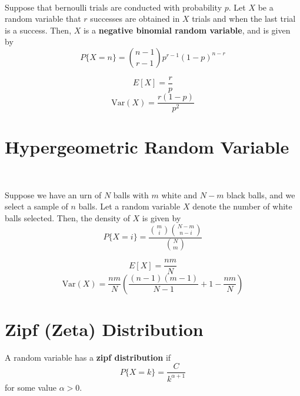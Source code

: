 \documentclass{article}
\begin{document}
\ 

\begin{definition}

Suppose that bernoulli trials are conducted with probability $p$. Let $X$ be a random variable that $r$ successes are obtained in $X$ trials and when the last trial is a success. Then, $X$ is a \textbf{negative binomial random variable}, and is given by $$P\{X = n\} = \binom{n-1}{r-1}p^{r-1}(1-p)^{n-r}$$

\end{definition}

\begin{proposition}

$$E[X] = \frac{r}{p}$$
$$\text{Var}(X) = \frac{r(1-p)}{p^2}$$

\end{proposition}

\section{Hypergeometric Random Variable}

\ 

\begin{definition}

Suppose we have an urn of $N$ balls with $m$ white and $N-m$ black balls, and we select a sample of $n$ balls. Let a random variable $X$ denote the number of white balls selected. Then, the density of $X$ is given by $$P\{X = i\} = \frac{\binom{m}{i}\binom{N-m}{n-i}}{\binom{N}{m}}$$

\end{definition}

\begin{proposition}
$$E[X] = \frac{nm}{N}$$
$$\text{Var}(X) = \frac{nm}{N}(\frac{(n-1)(m-1)}{N-1}+1-\frac{nm}{N})$$
\end{proposition}

\section{Zipf (Zeta) Distribution}

\begin{definition}[]
A random variable has a \textbf{zipf distribution} if $$P\{X = k\} = \frac{C}{k^{\alpha + 1}}$$for some value $\alpha > 0$.  
\end{definition}
\end{document}
